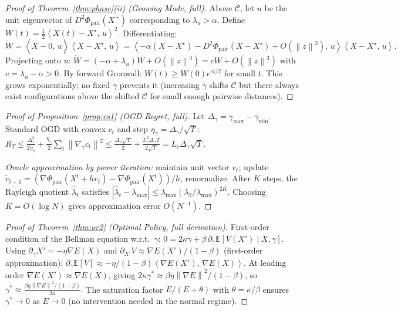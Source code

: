 \documentclass[11pt]{article}
\theoremstyle{definition}
\newcommand{\E}{\mathbb{E}}
\newcommand{\Xst}{X^{\star}}
\newcommand{\grad}{\nabla}
\newcommand{\Cman}{\mathcal{C}}
\newcommand{\lmax}{\lambda_{\max}}
\newcommand{\norm}[1]{\left\|#1\right\|}
\newcommand{\inner}[2]{\left\langle #1,\, #2\right\rangle}
\begin{document}
\begin{appendices}
\begin{proof}[Proof of Theorem~\ref{thm:phase}(ii) (Growing Mode, full)]
Above $\Cman$, let $u$ be the unit eigenvector of $D^2\Phi_{\mathrm{pair}}(X^+)$
corresponding to $\lambda_u > \alpha$.  Define $W(t) = \tfrac{1}{2}\inner{X(t)-\Xst}{u}^2$.
Differentiating:
$\dot W = \inner{\dot X - 0}{u}\inner{X-\Xst}{u}
= \inner{-\alpha(X-\Xst) - D^2\Phi_{\mathrm{pair}}(X-\Xst)+O(\norm{z}^2)}{u}\inner{X-\Xst}{u}.$
Projecting onto $u$: $\dot W = (-\alpha + \lambda_u)W + O(\norm{z}^3) = cW + O(\norm{z}^3)$
with $c = \lambda_u - \alpha > 0$.  By forward Gronwall:
$W(t) \ge W(0)e^{ct/2}$ for small $t$.  This grows exponentially; no fixed
$\bar\gamma$ prevents it (increasing $\bar\gamma$ shifts $\Cman$ but there always
exist configurations above the shifted $\Cman$ for small enough pairwise distances).
\end{proof}

\begin{proof}[Proof of Proposition~\ref{prop:cs1} (OGD Regret, full)]
Let $\Delta_\gamma = \gamma_{\max} - \gamma_{\min}$.  Standard OGD
\citep{hazan2016oco} with convex $c_t$ and step $\eta_\gamma = \Delta_\gamma/\sqrt{T}$:
$R_T \le \frac{\Delta_\gamma^2}{2\eta_\gamma} + \frac{\eta_\gamma}{2}\sum_t\norm{\nabla_\gamma c_t}^2
\le \frac{\Delta_\gamma\sqrt{T}}{2} + \frac{L_c^2\Delta_\gamma T}{2\sqrt{T}}
= L_c\Delta_\gamma\sqrt{T}.$

\textit{Oracle approximation by power iteration:} maintain unit vector $v_t$;
update $\tilde v_{t+1} = (\grad\Phi_{\mathrm{pair}}(X^t + hv_t) -
\grad\Phi_{\mathrm{pair}}(X^t))/h$, renormalize.  After $K$ steps, the
Rayleigh quotient $\hat\lambda_t$ satisfies
$|\hat\lambda_t - \lmax| \le \lmax(\lambda_2/\lmax)^{2K}$.
Choosing $K = O(\log N)$ gives approximation error $O(N^{-1})$.
\end{proof}

\begin{proof}[Proof of Theorem~\ref{thm:or2} (Optimal Policy, full derivation)]
First-order condition of the Bellman equation w.r.t.\ $\gamma$:
$0 = 2\kappa\gamma + \beta\,\partial_\gamma\E[V(X')\mid X,\gamma].$
Using $\partial_\gamma X' = -\eta\grad E(X)$ and $\partial_{X'} V \approx \grad E(X')/(1-\beta)$
(first-order approximation):
$\partial_\gamma\E[V] \approx -\eta/(1-\beta)\inner{\grad E(X')}{\grad E(X)}.$
At leading order $\grad E(X') \approx \grad E(X)$, giving
$2\kappa\gamma^* \approx \beta\eta\norm{\grad E}^2/(1-\beta)$, so
$\gamma^* \approx \frac{\beta\eta\norm{\grad E}^2/(1-\beta)}{2\kappa}.$
The saturation factor $E/(E+\theta)$ with $\theta = \kappa/\beta$ ensures
$\gamma^*\to 0$ as $E\to 0$ (no intervention needed in the normal regime).
\end{proof}


\end{appendices}
\end{document}
